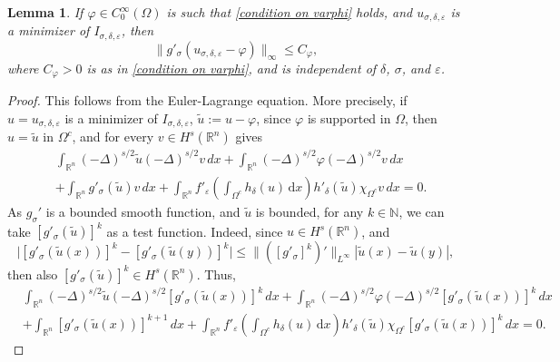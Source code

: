 \documentclass[11pt, reqno]{amsart}
\newtheorem{lemma}{Lemma}
\numberwithin{equation}{section}
\numberwithin{theorem}{section}
\numberwithin{lemma}{section}
\numberwithin{corollary}{section}
\numberwithin{remark}{section}
\numberwithin{proposition}{section}
\numberwithin{definition}{section}
\newcommand{\R}{\mathbb{R}}
\newcommand{\e}{\varepsilon}
\begin{document}
\begin{lemma}\label{l3.1}
	If $\varphi\in C_0^\infty(\Omega)$ is such that \eqref{condition on varphi} holds, and
    $u_{\sigma, \delta,\varepsilon}$ is a minimizer of $I_{\sigma,\delta, \e}$, then  	
	\begin{equation}\label{3.1}
	\|g'_\sigma(u_{\sigma, \delta,\varepsilon}-\varphi)\|_\infty\le C_\varphi,
	\end{equation} 
	where $C_\varphi>0$ is as in \eqref{condition on varphi}, and is independent of $\delta$, $\sigma$, and $\varepsilon$.
\end{lemma}
\begin{proof}
This follows from the Euler-Lagrange equation. More precisely, if $u=u_{\sigma,\delta,\varepsilon}$ is a minimizer of $I_{\sigma,\delta,\varepsilon}$, $\tilde{u}:=u-\varphi$, since $\varphi$ is supported in $\Omega$, then $u=\tilde{u}$ in $\Omega^c$,  and  for every $v\in H^s(\R^n)$ gives
\begin{equation*}\label{3.3}
        \begin{split}
            &\int_{\R^n}(-\Delta)^{s/2}\tilde{u}(-\Delta)^{s/2}v\,dx+\int_{\R^n}(-\Delta)^{s/2}\varphi(-\Delta)^{s/2}v\,dx\\
            &+\int_{\R^n}g'_\sigma(\tilde{u})v\,dx+\int_{\R^n}f'_\varepsilon\left(\int_{\Omega^c} h_\delta(u)\,\mathrm{d}x\right)h'_\delta(\tilde{u})\chi_{\Omega^c}v\,dx=0.
        \end{split}   
\end{equation*}
As $g_\sigma'$ is a bounded smooth function, and $\tilde{u}$ is bounded, for any $k\in\mathbb{N}$, we can take $[g'_\sigma(\tilde{u})]^k$ as a test function. Indeed, since $u\in H^s(\R^n)$, and
$$
\big|[g'_\sigma(\tilde{u}(x))]^k-[g'_\sigma(\tilde{u}(y))]^k\big|\le\|([g'_\sigma]^k)'\|_{L^\infty}|\tilde{u}(x)-\tilde{u}(y)|,
$$
then also $[g'_\sigma(\tilde{u})]^k\in H^s(\R^n)$.
Thus,
\begin{equation*}\label{n4.2}
    \begin{split}
            &\int_{\R^n}(-\Delta)^{s/2}\tilde{u}(-\Delta)^{s/2}[g'_\sigma(\tilde{u}(x))]^k\,dx+\int_{\R^n}(-\Delta)^{s/2}\varphi(-\Delta)^{s/2}[g'_\sigma(\tilde{u}(x))]^k\,dx\\
            &+\int_{\R^n}[g'_\sigma(\tilde{u}(x))]^{k+1}\,dx+\int_{\R^n}f'_\varepsilon\left(\int_{\Omega^c} h_\delta(u)\,\mathrm{d}x\right)h'_\delta(\tilde{u})\chi_{\Omega^c}[g'_\sigma(\tilde{u}(x))]^k\,dx=0.
        \end{split}
\end{equation*}

\end{proof}
\end{document}
